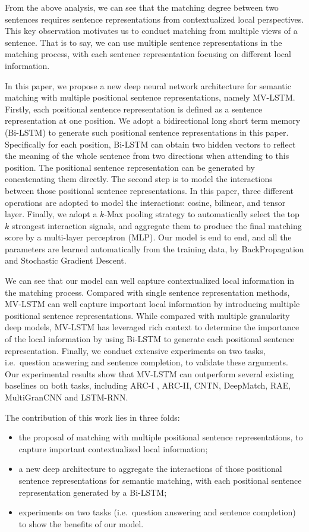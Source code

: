 \documentclass[letterpaper]{article}
\begin{document}
From the above analysis, we can see that the matching degree between two sentences requires sentence representations from contextualized local perspectives. This key observation motivates us to conduct matching from multiple views of a sentence. That is to say, we can use multiple sentence representations in the matching process, with each sentence representation focusing on different local information.

In this paper, we propose a new deep neural network architecture for semantic matching with multiple positional sentence representations, namely MV-LSTM.
Firstly, each positional sentence representation is defined as a sentence representation at one position. We adopt a bidirectional long short term memory (Bi-LSTM) to generate such positional sentence representations in this paper. Specifically for each position, Bi-LSTM can obtain two hidden vectors to reflect the meaning of the whole sentence from two directions when attending to this position. The positional sentence representation can be generated by concatenating them directly.
The second step is to model the interactions between those positional sentence representations. In this paper, three different operations are adopted to model the interactions: cosine, bilinear, and tensor layer. Finally, we adopt a $k$-Max pooling strategy to automatically select the top $k$ strongest interaction signals, and aggregate them to produce the final matching score by a multi-layer perceptron (MLP).
Our model is end to end, and all the parameters are learned automatically from the training data, by BackPropagation and Stochastic Gradient Descent.

We can see that our model can well capture contextualized local information in the matching process. Compared with single sentence representation methods, MV-LSTM can well capture important local information by introducing multiple positional sentence representations. While compared with multiple granularity deep models, MV-LSTM has leveraged rich context to determine the importance of the local information by using Bi-LSTM to generate each positional sentence representation.
Finally, we conduct extensive experiments on two tasks, i.e.~question answering and sentence completion, to validate these arguments. Our experimental results show that MV-LSTM can outperform several existing baselines on both tasks, including ARC-I , ARC-II, CNTN, DeepMatch, RAE, MultiGranCNN and LSTM-RNN.

The contribution of this work lies in three folds:
\begin{itemize}
\item the proposal of matching with multiple positional sentence representations, to capture important contextualized local information;
\item a new deep architecture to aggregate the interactions of those positional sentence representations for semantic matching, with each positional sentence representation generated by a Bi-LSTM;
\item experiments on two tasks (i.e.~question answering and sentence completion) to show the benefits of our model.
\end{itemize}
\end{document}
